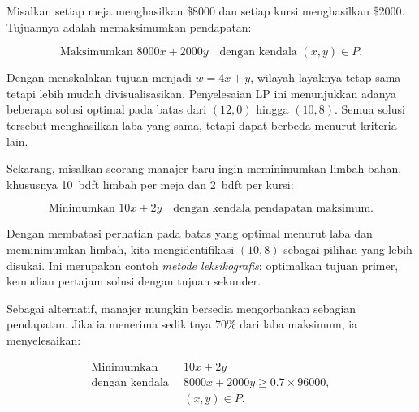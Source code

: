 Misalkan setiap meja menghasilkan \$8000 dan setiap kursi menghasilkan \$2000. Tujuannya adalah memaksimumkan pendapatan:

\[
\text{Maksimumkan } 8000x + 2000y \quad \text{dengan kendala } (x, y) \in P.
\]

Dengan menskalakan tujuan menjadi \(w = 4x + y\), wilayah layaknya tetap sama tetapi lebih mudah divisualisasikan. Penyelesaian LP ini menunjukkan adanya beberapa solusi optimal pada batas dari \((12, 0)\) hingga \((10, 8)\). Semua solusi tersebut menghasilkan laba yang sama, tetapi dapat berbeda menurut kriteria lain.

Sekarang, misalkan seorang manajer baru ingin meminimumkan limbah bahan, khususnya 10~bdft limbah per meja dan 2~bdft per kursi:

\[
\text{Minimumkan } 10x + 2y \quad \text{dengan kendala pendapatan maksimum}.
\]

Dengan membatasi perhatian pada batas yang optimal menurut laba dan meminimumkan limbah, kita mengidentifikasi \((10, 8)\) sebagai pilihan yang lebih disukai. Ini merupakan contoh \emph{metode leksikografis}: optimalkan tujuan primer, kemudian pertajam solusi dengan tujuan sekunder.

Sebagai alternatif, manajer mungkin bersedia mengorbankan sebagian pendapatan. Jika ia menerima sedikitnya 70\% dari laba maksimum, ia menyelesaikan:

\[
\begin{aligned}
\text{Minimumkan } &\, 10x + 2y \\
\text{dengan kendala } &\, 8000x + 2000y \ge 0.7 \times 96000,\\
&\, (x, y) \in P.
\end{aligned}
\]


